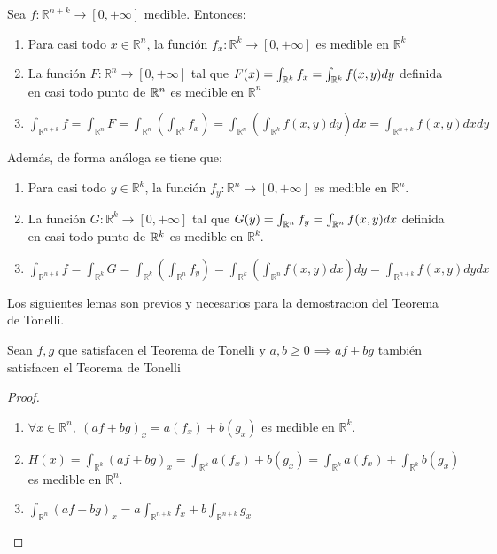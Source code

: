 \begin{teorema}
    Sea $f : \mathbb{R}^{n+k} \to [0, +\infty]$ medible. Entonces:
    \vspace{-0.5em}
    \begin{enumerate}
        \item Para casi todo $x \in \mathbb{R}^n$, la función $f_{x} : \mathbb{R}^k \to [0,
                      +\infty]$ es medible en $\mathbb{R}^k$
        \item La función $F: \mathbb{R}^n \to [0, +\infty]$ tal que $F(x) =
                  \int_{\mathbb{R}^k}f_x = \int_{\mathbb{R}^k} f(x,y)dy$ definida en casi todo punto de
              $\mathbb{R}^n$ es medible en $\mathbb{R}^n$
        \item $\int_{\mathbb{R}^{n+k}}f = \int_{\mathbb{R}^n}F = \int_{\mathbb{R}^n}(\int_{\mathbb{R}^k}f_x) = \int_{\mathbb{R}^n}(\int_{\mathbb{R}^k}f(x,y)dy)dx = \int_{\mathbb{R}^{n+k}}f(x,y)dxdy$
    \end{enumerate}
    Además, de forma análoga se tiene que:
    \vspace{-0.5em}
    \begin{enumerate}
        \item Para casi todo $y \in \mathbb{R}^k$, la función $f_{y} : \mathbb{R}^n \to [0,
                      +\infty]$ es medible en $\mathbb{R}^n$.
        \item La función $G: \mathbb{R}^k \to [0, +\infty]$ tal que $G(y) =
                  \int_{\mathbb{R}^n}f_y = \int_{\mathbb{R}^n} f(x,y)dx$ definida en casi todo punto de
              $\mathbb{R}^k$ es medible en $\mathbb{R}^k$.
        \item $\int_{\mathbb{R}^{n+k}}f = \int_{\mathbb{R}^k}G = \int_{\mathbb{R}^k}(\int_{\mathbb{R}^n}f_y) = \int_{\mathbb{R}^k}(\int_{\mathbb{R}^n}f(x,y)dx)dy = \int_{\mathbb{R}^{n+k}}f(x,y)dydx$
    \end{enumerate}
\end{teorema}

\begin{observación}
Los siguientes lemas son previos y necesarios para la demostracion del Teorema de Tonelli.
\end{observación}

\begin{lema}
    Sean $f,g$ que satisfacen el Teorema de Tonelli y $a, b \geq 0 \implies af + bg$ también satisfacen el Teorema de Tonelli\label{lema1Tonelli}
\end{lema}

\begin{proof}
    \leavevmode
    \begin{enumerate}
        \item $\forall x \in \mathbb{R}^n, \ (af + bg)_x = a(f_x) + b(g_x)$ es medible en $\mathbb{R}^k$.
        \item $H(x) = \int_{\mathbb{R}^k}(af + bg)_x = \int_{\mathbb{R}^k}a(f_x) + b(g_x) = \int_{\mathbb{R}^k}a(f_x) + \int_{\mathbb{R}^k}b(g_x)$ es medible en $\mathbb{R}^n$.
        \item $\int_{\mathbb{R}^{n}}(af +bg)_x = a\int_{\mathbb{R}^{n+k}}f_x + b \int_{\mathbb{R}^{n+k}}g_x$
    \end{enumerate}
\end{proof}

